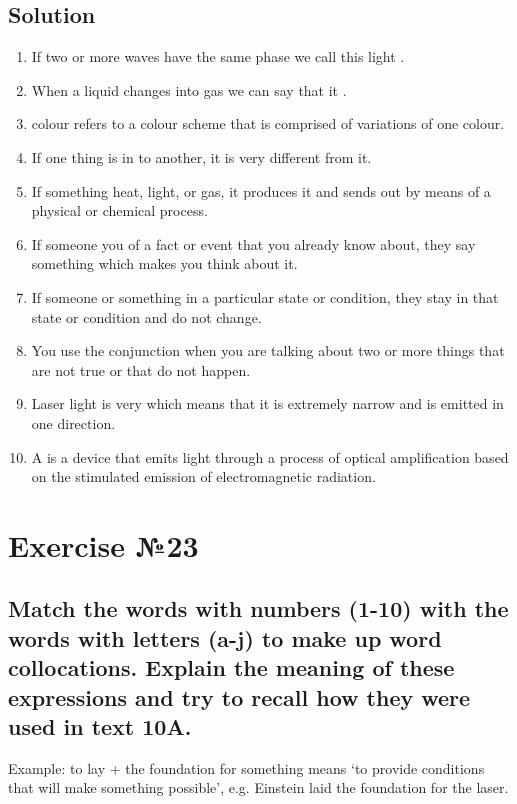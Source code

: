 \subsection*{Solution}
\begin{enumerate}
      \item If two or more waves have the same phase we call this light
            .
      \item When a liquid changes into gas we can say that it .
      \item {} colour refers to a colour scheme that is comprised
            of variations of one colour.
      \item If one thing is in  to another, it is very different
            from it.
      \item If something  heat, light, or gas, it produces it and sends
            out by means of a physical or chemical process.
      \item If someone  you of a fact or event that you already know
            about, they say something which makes you think about it.
      \item If someone or something  in a particular state or
            condition, they stay in that state or condition and do not change.
      \item You use the conjunction  when you are talking about
            two or more things that are not true or that do not happen.
      \item Laser light is very  which means that it is extremely
            narrow and is emitted in one direction.
      \item A  is a device that emits light through a process of
            optical amplification based on the stimulated emission of electromagnetic
            radiation.
\end{enumerate}

\section*{Exercise №23}
\subsection*{Match the words with numbers (1-10) with the words with letters (a-j) to
      make up word collocations. Explain the meaning of these expressions and try to
      recall how they were used in text 10A.}
Example: to lay + the foundation for something means ‘to provide conditions that will
make something possible’, e.g. Einstein laid the foundation for the laser.

